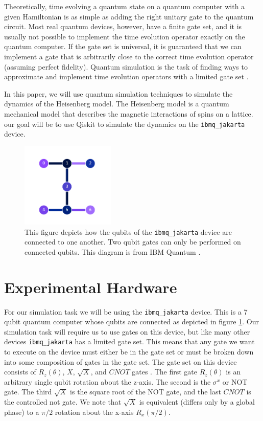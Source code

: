 \documentclass[aps,prl, reprint]{revtex4-2}
\begin{document}
Theoretically, time evolving a quantum state on a quantum computer with a given Hamiltonian is as simple as adding the right unitary gate to the quantum circuit. Most real quantum devices, however, have a finite gate set, and it is usually not possible to implement the time evolution operator exactly on the quantum computer. If the gate set is universal, it is guaranteed that we can implement a gate that is arbitrarily close to the correct time evolution operator (assuming perfect fidelity). Quantum simulation is the task of finding ways to approximate and implement time evolution operators with a limited gate set \cite{lloyd1996universal}.

In this paper, we will use quantum simulation techniques to simulate the dynamics of the Heisenberg model. The Heisenberg model is a quantum mechanical model that describes the magnetic interactions of spins on a lattice. our goal will be to use Qiskit to simulate the dynamics on the \texttt{ibmq\_jakarta} device.
\begin{figure}[b]
\includegraphics[width=0.4\textwidth]{JakartaDiagram.png}
\caption{This figure depicts how the qubits of the \texttt{ibmq\_jakarta} device are connected to one another. Two qubit gates can only be performed on connected qubits. This diagram is from IBM Quantum \cite{ibmquantum}.}
\label{fig:JakartaConnect}
\end{figure}
\section{Experimental Hardware}

For our simulation task we will be using the \texttt{ibmq\_jakarta} device. This is a 7 qubit quantum computer whose qubits are connected as depicted in figure \ref{fig:JakartaConnect}. Our simulation task will require us to use gates on this device, but like many other devices \texttt{ibmq\_jakarta} has a limited gate set. This means that any gate we want to execute on the device must either be in the gate set or must be broken down into some composition of gates in the gate set. The gate set on this device consists of $R_z(\theta)$, $X$, $\sqrt{X}$, and $CNOT$ gates \cite{ibmquantum}. The first gate $R_z(\theta)$ is an arbitrary single qubit rotation about the z-axis. The second is the $\sigma^{x}$ or NOT gate. The third $\sqrt{X}$ is the square root of the NOT gate, and the last $CNOT$ is the controlled not gate. We note that $\sqrt{X}$ is equivalent (differs only by a global phase) to a $\pi/2$ rotation about the x-axis $R_x(\pi/2)$.
\end{document}
